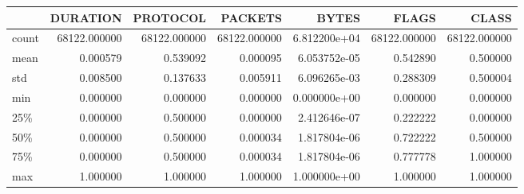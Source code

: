 \begin{tabular}{lrrrrrr}
\toprule
{} &      DURATION &      PROTOCOL &       PACKETS &         BYTES &         FLAGS &         CLASS \\
\midrule
count &  68122.000000 &  68122.000000 &  68122.000000 &  6.812200e+04 &  68122.000000 &  68122.000000 \\
mean  &      0.000579 &      0.539092 &      0.000095 &  6.053752e-05 &      0.542890 &      0.500000 \\
std   &      0.008500 &      0.137633 &      0.005911 &  6.096265e-03 &      0.288309 &      0.500004 \\
min   &      0.000000 &      0.000000 &      0.000000 &  0.000000e+00 &      0.000000 &      0.000000 \\
25\%   &      0.000000 &      0.500000 &      0.000000 &  2.412646e-07 &      0.222222 &      0.000000 \\
50\%   &      0.000000 &      0.500000 &      0.000034 &  1.817804e-06 &      0.722222 &      0.500000 \\
75\%   &      0.000000 &      0.500000 &      0.000034 &  1.817804e-06 &      0.777778 &      1.000000 \\
max   &      1.000000 &      1.000000 &      1.000000 &  1.000000e+00 &      1.000000 &      1.000000 \\
\bottomrule
\end{tabular}
